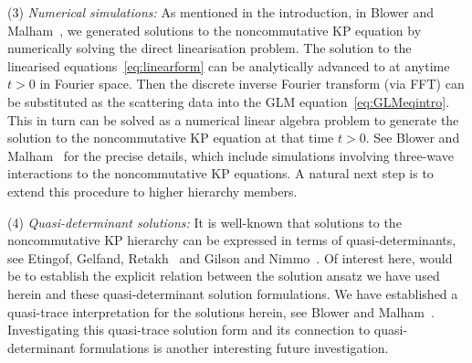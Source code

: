 \documentclass[5p,twocolumn]{elsarticle}
\begin{document}
(3) \emph{Numerical simulations:} As mentioned in the introduction, in Blower and Malham~\cite{BM-KP}, we generated solutions to the noncommutative KP equation by numerically solving the direct linearisation problem.
The solution to the linearised equations~\eqref{eq:linearform} can be analytically advanced to at anytime $t>0$ in Fourier space. 
Then the discrete inverse Fourier transform (via FFT) can be substituted as the scattering data into the GLM equation~\eqref{eq:GLMeqintro}.
This in turn can be solved as a numerical linear algebra problem to generate the solution to the noncommutative KP equation at that time $t>0$. 
See Blower and Malham~\cite{BM-KP} for the precise details, which include simulations involving three-wave interactions to the noncommutative KP equations. 
A natural next step is to extend this procedure to higher hierarchy members.

(4) \emph{Quasi-determinant solutions:} It is well-known that solutions to the noncommutative KP hierarchy can be expressed in terms of quasi-determinants,
see Etingof, Gelfand, Retakh~\cite{EGR97,EGR98} and Gilson and Nimmo~\cite{GN}.
Of interest here, would be to establish the explicit relation between the solution ansatz we have used herein and these quasi-determinant solution formulations.
We have established a quasi-trace interpretation for the solutions herein, see Blower and Malham~\cite{BM-KP}.
Investigating this quasi-trace solution form and its connection to quasi-determinant formulations is another interesting future investigation.
\end{document}
